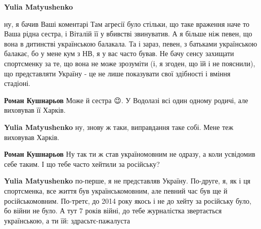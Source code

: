 \begin{itemize}
\begin{itemize}
\textbf{Yulia Matyushenko} 

ну, я бачив Ваші коментарі \Smiley[1.0][yellow] Там агресії було стільки, що таке враження наче
то Ваша рідна сестра, і Віталій її у вбивстві звинуватив. А я більше ніж певен,
що вона в дитинстві українською балакала. Та і зараз, певен, з батьками
українською балакає, бо у мене кум з НВ, я у вас часто бував. Не бачу сенсу
захищати спортсменку за те, що вона не може зрозуміти (і, я згоден, що їй і не
пояснили), що представляти Україну - це не лише показувати свої здібності і
вміння стадіоні.


 
\textbf{Роман Кушнарьов} Може й сестра 😉. У Водолазі всі один одному родичі, але виховував її Харків.

 
\textbf{Yulia Matyushenko} ну, знову ж таки, виправдання таке собі. Мене теж виховував Харків.

 
\textbf{Роман Кушнарьов} Ну так ти ж став україномовним не одразу, а коли усвідомив себе таким. І що тебе часто хейтили за російську?

 
\textbf{Yulia Matyushenko} по-перше, я не представляв Україну. По-друге, я, як
і ця спортсменка, все життя був українськомовним, але певний час був ще й
російськомовним. По-третє, до 2014 року якось і не до хейту за російську було,
бо війни не було. А тут 7 років війні, до тебе журналістка звертається
українською, а ти їй: здрасьтє-пажалуста


\end{itemize}
\end{itemize}
